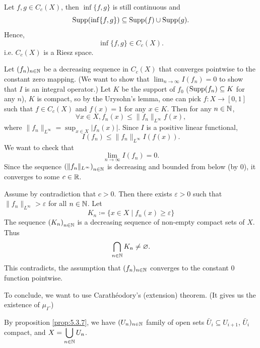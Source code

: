 \begin{proofenv}
    Let $f, g \in C_{c}(X)$,
    then $\inf\{f,g\}$ is still continuous and
    $$\operatorname{\mathrm{Supp}}(\inf\{f,g\}) \subseteq \operatorname{\mathrm{Supp}}(f) \cup \operatorname{\mathrm{Supp}}(g).$$
    Hence, 
    $$\inf\{f,g\} \in C_c(X).$$
    i.e. $C_c(X)$ is a Riesz space.
    
    \quad Let $(f_n)_{n \in \mathbb{N}}$ be a decreasing sequence in $C_c(X)$ that converges pointwise to the constant zero mapping.
    (We want to show that $\displaystyle \lim_{n \rightarrow \infty}I(f_n) = 0$ to show that $I$ is an integral operator.)
    Let $K$ be the support of $f_0$ ($\operatorname{\mathrm{Supp}} (f_n) \subseteq K$ for any $n$),
    $K$ is compact,
    so by the Urysohn's lemma,
    one can pick $f : X \rightarrow [0,1]$ such that $f \in C_c(X)$ and $f(x) = 1$ for any $x \in K$.
    Then for any $n \in \mathbb{N}$,
    $$\forall x \in X, f_n(x) \le \|f_{n}\|_{L^\infty} f(x),$$
    where $\displaystyle \|f_{n}\|_{L^\infty} = \sup_{x \in X} |f_n(x)|$.
    Since $I$ is a positive linear functional,
    $$I(f_n) \le \|f_{n}\|_{L^\infty} I(f(x)).$$
    We want to check that
    $$\lim_{n \rightarrow \infty}I(f_n) = 0.$$
    Since the sequence $\left(\|f_{n}\|_{L^\infty}\right)_{n \in \mathbb{N}}$ is decreasing and bounded from below (by $0$),
    it converges to some $c \in \mathbb{R}$.

    \quad Assume by contradiction that $c > 0$.
    Then there exists $\varepsilon > 0$ such that $\|f_{n}\|_{L^\infty} > \varepsilon$ for all $n \in \mathbb{N}$.
    Let
    $$K_{n} \coloneq \{x \in X \mid f_{n} (x) \ge \varepsilon\}$$
    The sequence $\left(K_{n}\right)_{n \in \mathbb{N}}$ is a decreasing sequence of non-empty compact sets of $X$.
    Thus
    $$\bigcap_{n \in \mathbb{N}} K_{n} \neq \varnothing.$$
    This contradicts, the assumption that $(f_n)_{n\in \mathbb{N}}$ converges to the constant $0$ function pointwise.
    
    \quad To conclude, we want to use Carath\'eodory's (extension) theorem.
    (It gives us the existence of $\mu_I$.)

    \quad By proposition \ref{prop:5.3.7}, we have $(U_n)_{n \in \mathbb{N}}$ family of open sets $\bar{U}_{i} \subseteq U_{i+1}$, $\bar{U}_{i}$ compact,
    and $\displaystyle X = \bigcup_{n \in \mathbb{N}} U_{n}$.
\end{proofenv}

